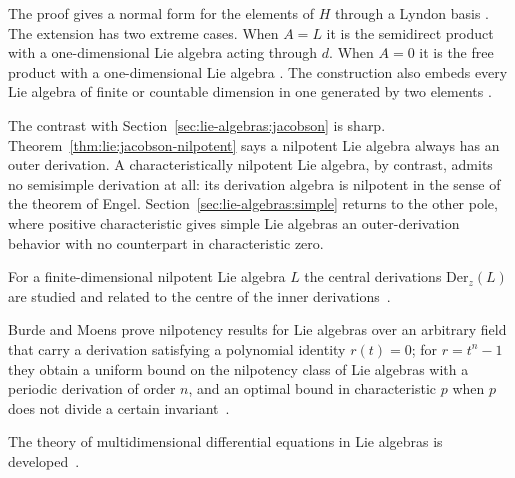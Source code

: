The proof gives a normal form for the elements of $H$ through a Lyndon basis
\cite[Theorem~5.1, p.~84]{Wasserman1998}. The extension has two extreme cases.
When $A=L$ it is the semidirect product with a one-dimensional Lie algebra
acting through $d$. When $A=0$ it is the free product with a one-dimensional
Lie algebra \cite[p.~83]{Wasserman1998}. The construction also
embeds every Lie algebra of finite or countable dimension in one generated by two
elements \cite[Theorem~7.2, p.~88]{Wasserman1998}.

The contrast with Section~\ref{sec:lie-algebras:jacobson} is sharp.
Theorem~\ref{thm:lie:jacobson-nilpotent} says a nilpotent Lie algebra
always has an outer derivation.
A characteristically nilpotent Lie
algebra, by contrast, admits no semisimple derivation at all: its derivation
algebra is nilpotent in the sense of the theorem of Engel.
Section~\ref{sec:lie-algebras:simple} returns
to the other pole, where positive characteristic gives simple Lie algebras
an outer-derivation behavior with no counterpart in characteristic zero.

For a finite-dimensional nilpotent Lie algebra $L$ the central derivations $\mathrm{Der}_z(L)$ are studied and related to the centre of the inner derivations~\cite{WlFiniteDimensionalNilpotentLieA2018}.

Burde and Moens prove nilpotency results for Lie algebras over an arbitrary field that carry a derivation satisfying a polynomial identity $r(t)=0$; for $r=t^n-1$ they obtain a uniform bound on the nilpotency class of Lie algebras with a periodic derivation of order $n$, and an optimal bound in characteristic $p$ when $p$ does not divide a certain invariant~\cite{WlTheStructureOfLieAlgebrasWithA2022}.

The theory of multidimensional differential equations in Lie algebras is developed~\cite{WlTheTheoryOfMultidimensionalDif2020}.
